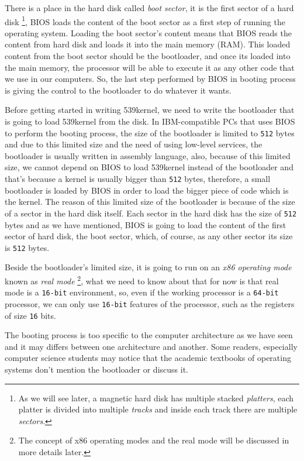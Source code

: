 There is a place in the hard disk called \emph{boot sector}, it is the
first sector of a hard disk \footnote{As we will see later, a magnetic
  hard disk has multiple stacked \emph{platters}, each platter is
  divided into multiple \emph{tracks} and inside each track there are
  multiple \emph{sectors}.}, BIOS loads the content of the boot sector
as a first step of running the operating system. Loading the boot
sector's content means that BIOS reads the content from hard disk and
loads it into the main memory (RAM). This loaded content from the boot
sector should be the bootloader, and once its loaded into the main
memory, the processor will be able to execute it as any other code that
we use in our computers. So, the last step performed by BIOS in booting
process is giving the control to the bootloader to do whatever it wants.

Before getting started in writing 539kernel, we need to write the
bootloader that is going to load 539kernel from the disk. In
IBM-compatible PCs that uses BIOS to perform the booting process, the
size of the bootloader is limited to \lstinline!512! bytes and due to
this limited size and the need of using low-level services, the
bootloader is usually written in assembly language, also, because of
this limited size, we cannot depend on BIOS to load 539kernel instead of
the bootloader and that's because a kernel is usually bigger than
\lstinline!512! bytes, therefore, a small bootloader is loaded by BIOS
in order to load the bigger piece of code which is the kernel. The
reason of this limited size of the bootloader is because of the size of
a sector in the hard disk itself. Each sector in the hard disk has the
size of \lstinline!512! bytes and as we have mentioned, BIOS is going to
load the content of the first sector of hard disk, the boot sector,
which, of course, as any other sector its size is \lstinline!512! bytes.

Beside the bootloader's limited size, it is going to run on an \emph{x86
operating mode} known as \emph{real mode} \footnote{The concept of x86
  operating modes and the real mode will be discussed in more details
  later.}, what we need to know about that for now is that real mode is
a \lstinline!16-bit! environment, so, even if the working processor is a
\lstinline!64-bit! processor, we can only use \lstinline!16-bit!
features of the processor, such as the registers of size \lstinline!16!
bits.

The booting process is too specific to the computer architecture as we
have seen and it may differs between one architecture and another. Some
readers, especially computer science students may notice that the
academic textbooks of operating systems don't mention the bootloader or
discuss it.

